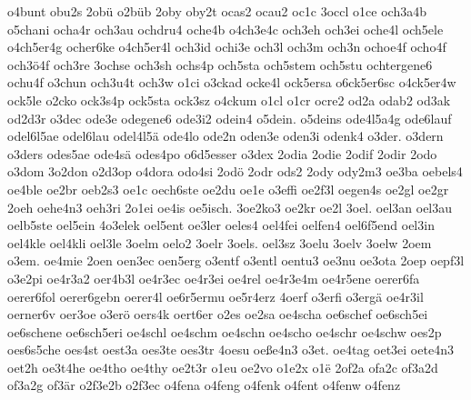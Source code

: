 {    o4bunt
    obu2s
    2obü
    o2büb
    2oby
    oby2t
    ocas2
    ocau2
    oc1c
    3occl
    o1ce
    och3a4b
    o5chani
    ocha4r
    och3au
    ochdru4
    oche4b
    o4ch3e4c
    och3eh
    och3ei
    oche4l
    och5ele
    o4ch5er4g
    ocher6ke
    o4ch5er4l
    och3id
    ochi3e
    och3l
    och3m
    och3n
    ochoe4f
    ocho4f
    och3ö4f
    och3re
    3ochse
    och3sh
    ochs4p
    och5sta
    och5stem
    och5stu
    ochtergene6
    ochu4f
    o3chun
    och3u4t
    och3w
    o1ci
    o3ckad
    ocke4l
    ock5ersa
    o6ck5er6sc
    o4ck5er4w
    ock5le
    o2cko
    ock3s4p
    ock5sta
    ock3sz
    o4ckum
    o1cl
    o1cr
    ocre2
    od2a
    odab2
    od3ak
    od2d3r
    o3dec
    ode3e
    odegene6
    ode3i2
    odein4
    o5dein.
    o5deins
    ode4l5a4g
    ode6lauf
    odel6l5ae
    odel6lau
    odel4l5ä
    ode4lo
    ode2n
    oden3e
    oden3i
    odenk4
    o3der.
    o3dern
    o3ders
    odes5ae
    ode4sä
    odes4po
    o6d5esser
    o3dex
    2odia
    2odie
    2odif
    2odir
    2odo
    o3dom
    3o2don
    o2d3op
    o4dora
    odo4si
    2odö
    2odr
    ods2
    2ody
    ody2m3
    oe3ba
    oebels4
    oe4ble
    oe2br
    oeb2s3
    oe1c
    oech6ste
    oe2du
    oe1e
    o3effi
    oe2f3l
    oegen4s
    oe2gl
    oe2gr
    2oeh
    oehe4n3
    oeh3ri
    2o1ei
    oe4is
    oe5isch.
    3oe2ko3
    oe2kr
    oe2l
    3oel.
    oel3an
    oel3au
    oelb5ste
    oel5ein
    4o3elek
    oel5ent
    oe3ler
    oeles4
    oel4fei
    oelfen4
    oel6f5end
    oel3in
    oel4kle
    oel4kli
    oel3le
    3oelm
    oelo2
    3oelr
    3oels.
    oel3sz
    3oelu
    3oelv
    3oelw
    2oem
    o3em.
    oe4mie
    2oen
    oen3ec
    oen5erg
    o3entf
    o3entl
    oentu3
    oe3nu
    oe3ota
    2oep
    oepf3l
    o3e2pi
    oe4r3a2
    oer4b3l
    oe4r3ec
    oe4r3ei
    oe4rel
    oe4r3e4m
    oe4r5ene
    oerer6fa
    oerer6fol
    oerer6gebn
    oerer4l
    oe6r5ermu
    oe5r4erz
    4oerf
    o3erfi
    o3ergä
    oe4r3il
    oerner6v
    oer3oe
    o3erö
    oers4k
    oert6er
    o2es
    oe2sa
    oe4scha
    oe6schef
    oe6sch5ei
    oe6schene
    oe6sch5eri
    oe4schl
    oe4schm
    oe4schn
    oe4scho
    oe4schr
    oe4schw
    oes2p
    oes6s5che
    oes4st
    oest3a
    oes3te
    oes3tr
    4oesu
    oeße4n3
    o3et.
    oe4tag
    oet3ei
    oete4n3
    oet2h
    oe3t4he
    oe4tho
    oe4thy
    oe2t3r
    o1eu
    oe2vo
    o1e2x
    o1ë
    2of2a
    ofa2c
    of3a2d
    of3a2g
    of3är
    o2f3e2b
    o2f3ec
    o4fena
    o4feng
    o4fenk
    o4fent
    o4fenw
    o4fenz
}
